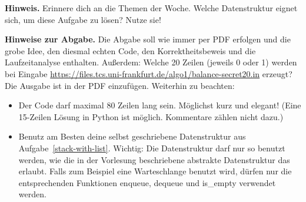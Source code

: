 \documentclass{uebung_cs}
\begin{document}
\begin{aufgabe}
  \textbf{Hinweis.}
  Erinnere dich an die Themen der Woche. Welche Datenstruktur eignet sich, um diese Aufgabe zu lösen? Nutze sie!
  
  \textbf{Hinweise zur Abgabe.}
  Die Abgabe soll wie immer per PDF erfolgen und die grobe Idee, den diesmal echten Code, den Korrektheitsbeweis und die Laufzeitanalyse enthalten.
  Außerdem: Welche 20 Zeilen (jeweils 0 oder 1) werden bei Eingabe \url{https://files.tcs.uni-frankfurt.de/algo1/balance-secret20.in} erzeugt? Die Ausgabe ist in der PDF einzufügen.
  Weiterhin zu beachten:
  \begin{itemize}
  \item Der Code darf maximal 80 Zeilen lang sein. Möglichst kurz und elegant! (Eine 15-Zeilen Lösung in Python ist möglich. Kommentare zählen nicht dazu.)
  \item Benutz am Besten deine selbst geschriebene Datenstruktur aus Aufgabe~\ref{stack-with-list}. Wichtig: Die Datenstruktur darf nur so benutzt werden, wie die in der Vorlesung beschriebene abstrakte Datenstruktur das erlaubt. Falls zum Beispiel eine Warteschlange benutzt wird, dürfen nur die entsprechenden Funktionen enqueue, dequeue und is\_empty verwendet werden.
  \end{itemize}

\end{aufgabe}
\end{document}
